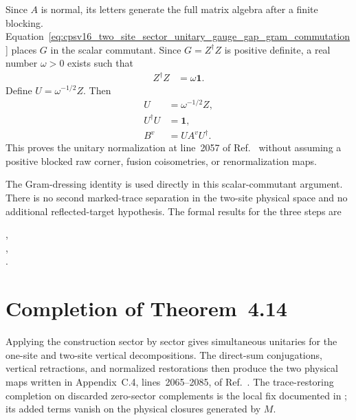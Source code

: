 \documentclass{article}
\begin{document}
Since $A$ is normal, its letters generate the full matrix algebra after a
finite blocking. Equation~\ref{eq:cpsv16_two_site_sector_unitary_gauge_gap_gram_commutation}
places $G$ in the scalar commutant. Since $G=Z^\dagger Z$ is positive
definite, a real number $\omega>0$ exists such that
\begin{align}
    Z^\dagger Z
    &=\omega\mathbf 1.
    \label{eq:cpsv16_two_site_sector_unitary_gauge_gap_gram_scalar}
\end{align}
Define $U=\omega^{-1/2}Z$. Then
\begin{align}
    U
    &=\omega^{-1/2}Z,
    \label{eq:cpsv16_two_site_sector_unitary_gauge_gap_unitary_definition}\\
    U^\dagger U
    &=\mathbf 1,
    \label{eq:cpsv16_two_site_sector_unitary_gauge_gap_unitary_normalization}\\
    B^v
    &=UA^vU^\dagger.
    \label{eq:cpsv16_two_site_sector_unitary_gauge_gap_unitary_gauge}
\end{align}
This proves the unitary normalization at line~2057 of
Ref.~\cite{Cirac2016MPDO_arXiv} without assuming a positive blocked raw
corner, fusion coisometries, or renormalization maps.

The Gram-dressing identity is used directly in this scalar-commutant
argument. There is no second marked-trace separation in the two-site
physical space and no additional reflected-target hypothesis. The formal
results for the three steps are
\begin{center}
\scriptsize
\mbox{,}\\
\mbox{,}\\
\mbox{.}
\end{center}

\section{Completion of Theorem~4.14}

Applying the construction sector by sector gives simultaneous unitaries for
the one-site and two-site vertical decompositions. The direct-sum
conjugations, vertical retractions, and normalized restorations then produce
the two physical maps written in Appendix~C.4, lines~2065--2085, of
Ref.~\cite{Cirac2016MPDO_arXiv}. The trace-restoring completion on discarded
zero-sector complements is the local fix documented in
; its added
terms vanish on the physical closures generated by $M$.
\end{document}
